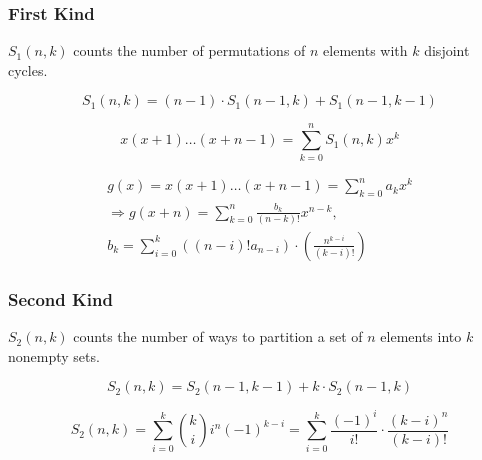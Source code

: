 \subsubsection{First Kind}

\vspace{-0.5em}
$S_1(n, k)$ counts the number of permutations of $n$ elements with $k$ disjoint cycles.

\vspace{-1.5em}
$$
S_1(n, k) = (n - 1) \cdot S_1(n - 1, k) + S_1(n - 1, k - 1)
$$

\vspace{-1.5em}
$$
x (x + 1) \ldots (x + n - 1) = \sum\limits_{k = 0}^n S_1(n, k) x^k
$$

\vspace{-1.5em}
$$
\begin{gathered}
g(x) = x(x + 1) \ldots (x + n - 1) = \sum\limits_{k = 0}^n a_kx^k \\ 
\Rightarrow g(x + n) = \sum\limits_{k = 0}^n \frac{b_k}{(n - k)!} x^{n - k}, \\
b_k = \sum\limits_{i = 0}^k ((n - i)! a_{n - i}) \cdot (\frac{n^{k - i}}{(k - i)!})
\end{gathered}
$$ 

\subsubsection{Second Kind}

$S_2(n, k)$ counts the number of ways to partition a set of $n$ elements into $k$ nonempty sets.

\vspace{-1.5em}
$$
S_2(n, k) = S_2(n - 1, k - 1) + k \cdot S_2(n - 1, k)
$$

\vspace{-1.5em}
$$
S_2(n, k) = \sum\limits_{i = 0}^k \binom{k}{i}i^n (-1)^{k - i} = \sum\limits_{i = 0}^k \frac{(-1)^i}{i!} \cdot \frac{(k - i)^n}{(k - i)!}
$$
